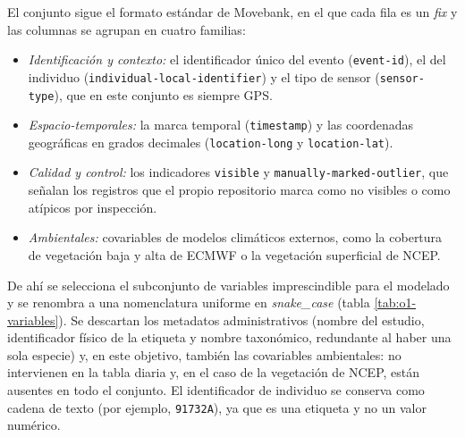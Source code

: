 El conjunto sigue el formato estándar de Movebank, en el que cada fila es un
\textit{fix} y las columnas se agrupan en cuatro familias:

\begin{itemize}
  \item \emph{Identificación y contexto:} el identificador único del evento
  (\texttt{event-id}), el del individuo (\texttt{individual-local-identifier}) y
  el tipo de sensor (\texttt{sensor-type}), que en este conjunto es siempre GPS.
  \item \emph{Espacio-temporales:} la marca temporal (\texttt{timestamp}) y las
  coordenadas geográficas en grados decimales (\texttt{location-long} y
  \texttt{location-lat}).
  \item \emph{Calidad y control:} los indicadores \texttt{visible} y
  \texttt{manually-marked-outlier}, que señalan los registros que el propio
  repositorio marca como no visibles o como atípicos por inspección.
  \item \emph{Ambientales:} covariables de modelos climáticos externos, como la
  cobertura de vegetación baja y alta de ECMWF o la vegetación superficial de
  NCEP\@.
\end{itemize}

De ahí se selecciona el subconjunto de variables imprescindible para el modelado y
se renombra a una nomenclatura uniforme en \textit{snake\_case} (tabla
\ref{tab:o1-variables}). Se descartan los metadatos administrativos (nombre del
estudio, identificador físico de la etiqueta y nombre taxonómico, redundante al
haber una sola especie) y, en este objetivo, también las covariables ambientales:
no intervienen en la tabla diaria y, en el caso de la vegetación de NCEP, están
ausentes en todo el conjunto. El identificador de individuo se conserva como
cadena de texto (por ejemplo, \texttt{91732A}), ya que es una etiqueta y no un
valor numérico.

